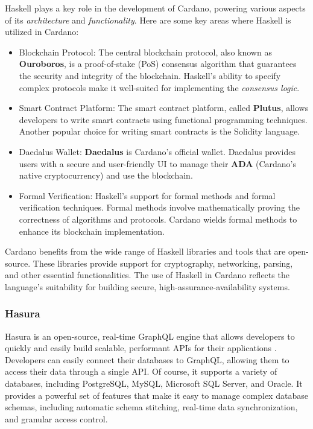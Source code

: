 \documentclass[a4paper, titlepage, twoside]{article}
\begin{document}
Haskell plays a key role in the development of Cardano, powering various aspects of its \emph{architecture} and \emph{functionality}. Here are some key areas where Haskell is utilized in Cardano:

\begin{itemize}
\item Blockchain Protocol: The central blockchain protocol, also known as \textbf{Ouroboros}, is a proof-of-stake (PoS) consensus algorithm that guarantees the security and integrity of the blockchain. Haskell's ability to specify complex protocols make it well-suited for implementing the \emph{consensus logic}.

\item Smart Contract Platform: The smart contract platform, called \textbf{Plutus}, allows developers to write smart contracts using functional programming techniques. Another popular choice for writing smart contracts is the Solidity language.

\item Daedalus Wallet: \textbf{Daedalus} is Cardano's official wallet. Daedalus provides users with a secure and user-friendly UI to manage their \textbf{ADA} (Cardano's native cryptocurrency) and use the blockchain.

\item Formal Verification: Haskell's support for formal methods and formal verification techniques. Formal methods involve mathematically proving the correctness of algorithms and protocols. Cardano wields formal methods to enhance its blockchain implementation.
\end{itemize}

Cardano benefits from the wide range of Haskell libraries and tools that are open-source. These libraries provide support for cryptography, networking, parsing, and other essential functionalities. The use of Haskell in Cardano reflects the language's suitability for building secure, high-assurance-availability systems.

\subsubsection{Hasura}
\label{sec:org3921319}

Hasura is an open-source, real-time GraphQL engine that allows developers to quickly and easily build scalable, performant APIs for their applications \autocite{hasuraInstantGraphQLAPIs}. Developers can easily connect their databases to GraphQL, allowing them to access their data through a single API. Of course, it supports a variety of databases, including PostgreSQL, MySQL, Microsoft SQL Server, and Oracle. It provides a powerful set of features that make it easy to manage complex database schemas, including automatic schema stitching, real-time data synchronization, and granular access control.
\end{document}

